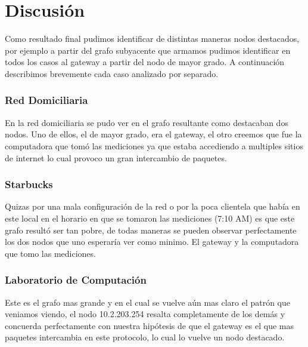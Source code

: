 \section{Discusión}

Como resultado final pudimos identificar de distintas maneras nodos destacados, por ejemplo a partir del grafo subyacente que armamos pudimos identificar en todos los casos al gateway a partir del nodo de mayor grado. A continuación describimos brevemente cada caso analizado por separado.

\subsubsection{Red Domiciliaria}

En la red domiciliaria se pudo ver en el grafo resultante como destacaban dos nodos. Uno de ellos, el de mayor grado, era el gateway, el otro creemos que fue la computadora que tomó las mediciones ya que estaba accediendo a multiples sitios de internet lo cual provoco un gran intercambio de paquetes.

\subsubsection{Starbucks}

Quizas por una mala configuración de la red o por la poca clientela que había en este local en el horario en que se tomaron las mediciones (7:10 AM) es que este grafo resultó ser tan pobre, de todas maneras se pueden observar perfectamente los dos nodos que uno esperaría ver como minimo. El gateway y la computadora que tomo las mediciones.

\subsubsection{Laboratorio de Computación}

Este es el grafo mas grande y en el cual se vuelve aún mas claro el patrón que veniamos viendo, el nodo 10.2.203.254 resalta completamente de los demás y concuerda perfectamente con nuestra hipótesis de que el gateway es el que mas paquetes intercambia en este protocolo, lo cual lo vuelve un nodo destacado.